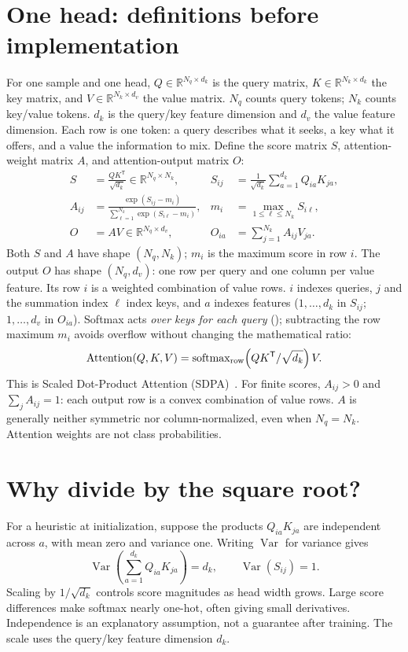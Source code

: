 \documentclass[11pt,a4paper,oneside]{report}
\newcommand{\R}{\mathbb{R}}
\newcommand{\softmax}{\operatorname{softmax}}
\newcommand{\code}[1]{\texttt{\detokenize{#1}}}
\begin{document}
\section{One head: definitions before implementation}
For one sample and one head, $Q\in\R^{N_q\times d_k}$ is the query matrix,
$K\in\R^{N_k\times d_k}$ the key matrix, and $V\in\R^{N_k\times d_v}$
the value matrix. $N_q$ counts query tokens; $N_k$ counts key/value tokens.
$d_k$ is the query/key feature dimension and $d_v$ the value feature dimension.
Each row is one token: a query describes what it seeks, a key what it offers,
and a value the information to mix. Define the score matrix $S$, attention-weight
matrix $A$, and attention-output matrix $O$:
\begin{align}
 S &= \frac{QK^{\mathsf T}}{\sqrt{d_k}}\in\R^{N_q\times N_k},
 &S_{ij}&=\frac{1}{\sqrt{d_k}}\sum_{a=1}^{d_k}Q_{ia}K_{ja},\label{eq:scores}\\
 A_{ij} &= \frac{\exp(S_{ij}-m_i)}{\sum_{\ell=1}^{N_k}\exp(S_{i\ell}-m_i)},
 &m_i&=\max_{1\leq\ell\leq N_k}S_{i\ell},\label{eq:softmax}\\
 O &= AV\in\R^{N_q\times d_v},
 &O_{ia}&=\sum_{j=1}^{N_k}A_{ij}V_{ja}.\label{eq:weightedvalues}
\end{align}
Both $S$ and $A$ have shape $(N_q,N_k)$; $m_i$ is the maximum score in row
$i$. The output $O$ has shape $(N_q,d_v)$: one row per query and one column
per value feature. Its row $i$ is a weighted combination of value rows.
$i$ indexes queries, $j$ and the summation index $\ell$ index keys,
and $a$ indexes features ($1,\ldots,d_k$ in $S_{ij}$; $1,\ldots,d_v$ in $O_{ia}$).
Softmax acts \emph{over keys for each query} (\code{dim=-1}); subtracting
the row maximum $m_i$ avoids overflow without changing the mathematical ratio:
\begin{equation}
 \operatorname{Attention}(Q,K,V)
 =\softmax_{\rm row}\!\left(QK^{\mathsf T}/\sqrt{d_k}\right)V.
\end{equation}
This is Scaled Dot-Product Attention (SDPA)~\cite{vaswani2017}. For finite scores,
$A_{ij}>0$ and $\sum_j A_{ij}=1$: each output row is a convex combination
of value rows. $A$ is generally neither symmetric nor column-normalized,
even when $N_q=N_k$. Attention weights are not class probabilities.

\section{Why divide by the square root?}
For a heuristic at initialization, suppose the products $Q_{ia}K_{ja}$ are
independent across $a$, with mean zero and variance one. Writing
$\operatorname{Var}$ for variance gives
\begin{equation}
 \operatorname{Var}\!\left(\sum_{a=1}^{d_k}Q_{ia}K_{ja}\right)=d_k,
 \qquad \operatorname{Var}(S_{ij})=1.
\end{equation}
Scaling by $1/\sqrt{d_k}$ controls score magnitudes as head width grows.
Large score differences make softmax nearly one-hot, often giving small
derivatives. Independence is an explanatory assumption, not a guarantee after
training. The scale uses the query/key feature dimension $d_k$.
\end{document}

